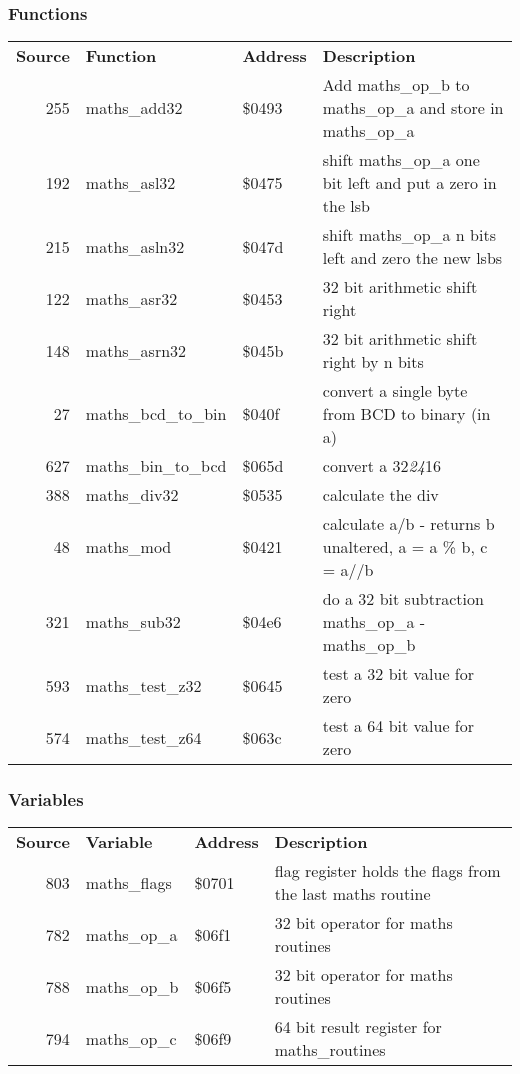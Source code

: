 \subsubsection{Functions}
\begin{tabular}{rllp{7cm}}
 \textbf{Source}&\textbf{Function}&\textbf{Address}&\textbf{Description}\\
 255&maths\_add32&\$0493&Add maths\_op\_b to maths\_op\_a and store in maths\_op\_a\\
 192&maths\_asl32&\$0475&shift maths\_op\_a one bit left and put a zero in the lsb\\
 215&maths\_asln32&\$047d&shift maths\_op\_a n bits left and zero the new lsbs\\
 122&maths\_asr32&\$0453&32 bit arithmetic shift right\\
 148&maths\_asrn32&\$045b&32 bit arithmetic shift right by n bits\\
 27&maths\_bcd\_to\_bin&\$040f&convert a single byte from BCD to binary (in a)\\
 627&maths\_bin\_to\_bcd&\$065d&convert a 32\textit{24}16\\
 388&maths\_div32&\$0535&calculate the div\\
 48&maths\_mod&\$0421&calculate a/b - returns b unaltered, a = a \% b, c = a//b\\
 321&maths\_sub32&\$04e6&do a 32 bit subtraction maths\_op\_a - maths\_op\_b\\
 593&maths\_test\_z32&\$0645&test a 32 bit value for zero\\
 574&maths\_test\_z64&\$063c&test a 64 bit value for zero\\
\end{tabular}

\subsubsection{Variables}
\begin{tabular}{rllp{7cm}}
 \textbf{Source}&\textbf{Variable}&\textbf{Address}&\textbf{Description}\\
 803&maths\_flags&\$0701&flag register holds the flags from the last maths routine\\
 782&maths\_op\_a&\$06f1&32 bit operator for maths routines\\
 788&maths\_op\_b&\$06f5&32 bit operator for maths routines\\
 794&maths\_op\_c&\$06f9&64 bit result register for maths\_routines\\
\end{tabular}

